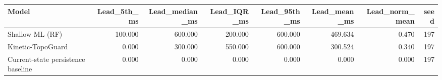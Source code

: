 \begin{tabular}{lrrrrrrr}
\toprule
Model & Lead\_5th\_ms & Lead\_median\_ms & Lead\_IQR\_ms & Lead\_95th\_ms & Lead\_mean\_ms & Lead\_norm\_mean & seed \\
\midrule
Shallow ML (RF) & 100.000 & 600.000 & 200.000 & 600.000 & 469.634 & 0.470 & 197 \\
Kinetic-TopoGuard & 0.000 & 300.000 & 550.000 & 600.000 & 300.524 & 0.340 & 197 \\
Current-state persistence baseline & 0.000 & 0.000 & 0.000 & 0.000 & 0.000 & 0.000 & 197 \\
\bottomrule
\end{tabular}